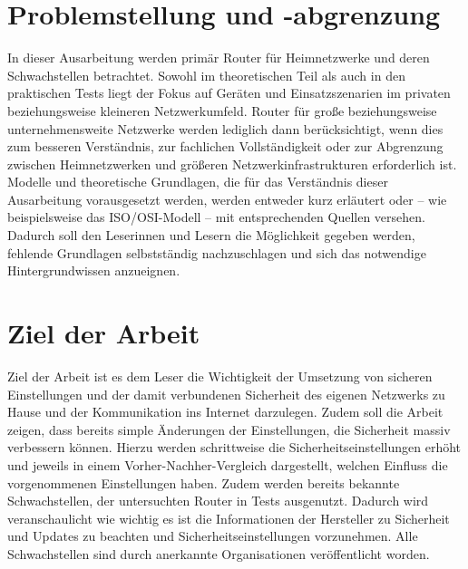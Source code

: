 	\section{Problemstellung und -abgrenzung}
	In dieser Ausarbeitung werden primär Router für Heimnetzwerke und deren 
	Schwachstellen betrachtet. 
	Sowohl im theoretischen Teil als auch in den praktischen Tests liegt 
	der Fokus auf Geräten und Einsatzszenarien im privaten beziehungsweise 
	kleineren Netzwerkumfeld. Router für große beziehungsweise unternehmensweite 
	Netzwerke werden lediglich dann berücksichtigt, wenn dies zum besseren 
	Verständnis, zur fachlichen Vollständigkeit oder zur Abgrenzung zwischen 
	Heimnetzwerken und größeren Netzwerkinfrastrukturen erforderlich ist.
	Modelle und theoretische Grundlagen, die für das Verständnis dieser
	Ausarbeitung vorausgesetzt werden, werden entweder kurz erläutert oder
	– wie beispielsweise das ISO/OSI-Modell – mit entsprechenden Quellen versehen.
	Dadurch soll den Leserinnen und Lesern die Möglichkeit gegeben werden,
	fehlende Grundlagen selbstständig nachzuschlagen und sich das notwendige
	Hintergrundwissen anzueignen.

	\section{Ziel der Arbeit}
	Ziel der Arbeit ist es dem Leser die Wichtigkeit der Umsetzung von sicheren
	Einstellungen und der damit verbundenen Sicherheit des eigenen Netzwerks
	zu Hause und der Kommunikation ins Internet darzulegen. Zudem soll die Arbeit
	zeigen, dass bereits simple Änderungen der Einstellungen, die Sicherheit
	massiv verbessern können. Hierzu werden schrittweise die Sicherheitseinstellungen
	erhöht und jeweils in einem Vorher-Nachher-Vergleich dargestellt, welchen
	Einfluss die vorgenommenen Einstellungen haben. Zudem werden
	bereits bekannte Schwachstellen, der untersuchten Router in Tests ausgenutzt.
	Dadurch wird veranschaulicht wie wichtig es ist die Informationen der Hersteller
	zu Sicherheit und Updates zu beachten und Sicherheitseinstellungen vorzunehmen.
	Alle Schwachstellen sind durch anerkannte Organisationen veröffentlicht worden.
	
